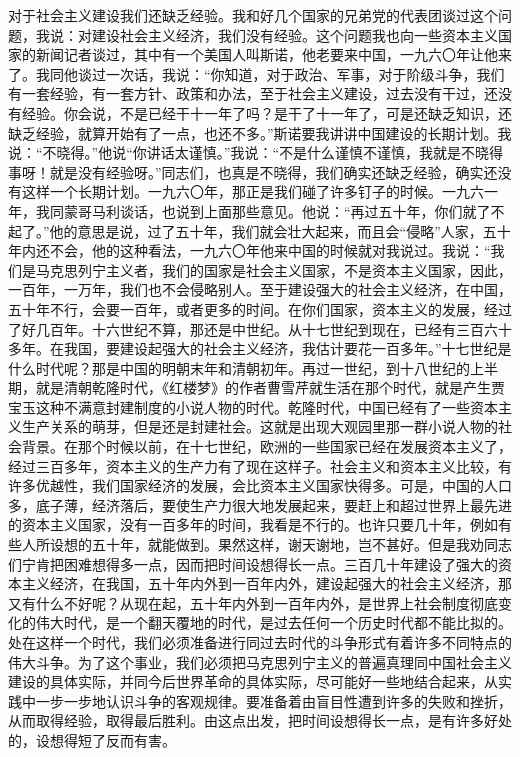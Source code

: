 对于社会主义建设我们还缺乏经验。我和好几个国家的兄弟党的代表团谈过这个问题，我说：对建设社会主义经济，我们没有经验。这个问题我也向一些资本主义国家的新闻记者谈过，其中有一个美国人叫斯诺，他老要来中国，一九六〇年让他来了。我同他谈过一次话，我说：“你知道，对于政治、军事，对于阶级斗争，我们有一套经验，有一套方针、政策和办法，至于社会主义建设，过去没有干过，还没有经验。你会说，不是已经干十一年了吗？是干了十一年了，可是还缺乏知识，还缺乏经验，就算开始有了一点，也还不多。”斯诺要我讲讲中国建设的长期计划。我说：“不晓得。”他说“你讲话太谨慎。”我说：“不是什么谨慎不谨慎，我就是不晓得事呀！就是没有经验呀。”同志们，也真是不晓得，我们确实还缺乏经验，确实还没有这样一个长期计划。一九六〇年，那正是我们碰了许多钉子的时候。一九六一年，我同蒙哥马利谈话，也说到上面那些意见。他说：“再过五十年，你们就了不起了。”他的意思是说，过了五十年，我们就会壮大起来，而且会“侵略”人家，五十年内还不会，他的这种看法，一九六〇年他来中国的时候就对我说过。我说：“我们是马克思列宁主义者，我们的国家是社会主义国家，不是资本主义国家，因此，一百年，一万年，我们也不会侵略别人。至于建设强大的社会主义经济，在中国，五十年不行，会要一百年，或者更多的时间。在你们国家，资本主义的发展，经过了好几百年。十六世纪不算，那还是中世纪。从十七世纪到现在，已经有三百六十多年。在我国，要建设起强大的社会主义经济，我估计要花一百多年。”十七世纪是什么时代呢？那是中国的明朝末年和清朝初年。再过一世纪，到十八世纪的上半期，就是清朝乾隆时代，《红楼梦》的作者曹雪芹就生活在那个时代，就是产生贾宝玉这种不满意封建制度的小说人物的时代。乾隆时代，中国已经有了一些资本主义生产关系的萌芽，但是还是封建社会。这就是出现大观园里那一群小说人物的社会背景。在那个时候以前，在十七世纪，欧洲的一些国家已经在发展资本主义了，经过三百多年，资本主义的生产力有了现在这样子。社会主义和资本主义比较，有许多优越性，我们国家经济的发展，会比资本主义国家快得多。可是，中国的人口多，底子薄，经济落后，要使生产力很大地发展起来，要赶上和超过世界上最先进的资本主义国家，没有一百多年的时间，我看是不行的。也许只要几十年，例如有些人所设想的五十年，就能做到。果然这样，谢天谢地，岂不甚好。但是我劝同志们宁肯把困难想得多一点，因而把时间设想得长一点。三百几十年建设了强大的资本主义经济，在我国，五十年内外到一百年内外，建设起强大的社会主义经济，那又有什么不好呢？从现在起，五十年内外到一百年内外，是世界上社会制度彻底变化的伟大时代，是一个翻天覆地的时代，是过去任何一个历史时代都不能比拟的。处在这样一个时代，我们必须准备进行同过去时代的斗争形式有着许多不同特点的伟大斗争。为了这个事业，我们必须把马克思列宁主义的普遍真理同中国社会主义建设的具体实际，并同今后世界革命的具体实际，尽可能好一些地结合起来，从实践中一步一步地认识斗争的客观规律。要准备着由盲目性遭到许多的失败和挫折，从而取得经验，取得最后胜利。由这点出发，把时间设想得长一点，是有许多好处的，设想得短了反而有害。

